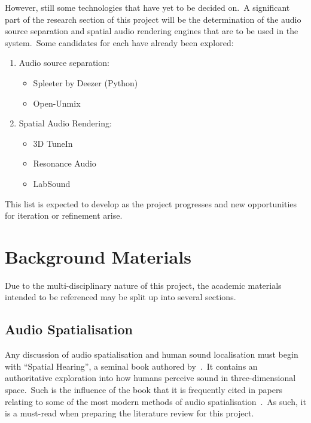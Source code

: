 \documentclass[a4paper, 12pt, british]{article}
\begin{document}
However, still some technologies that have yet to be decided on.\ A significant part of the research section of this project will be the determination of the audio source separation and spatial audio rendering engines that are to be used in the system.\ Some candidates for each have already been explored:

\begin{enumerate}
    \item Audio source separation:
    \begin{itemize}
        \item Spleeter by Deezer (Python)
        \item Open-Unmix
    \end{itemize}
    \item Spatial Audio Rendering:
    \begin{itemize}
        \item 3D TuneIn
        \item Resonance Audio
        \item LabSound
    \end{itemize}
\end{enumerate}

This list is expected to develop as the project progresses and new opportunities for iteration or refinement arise.

\section{Background Materials}\label{sec:background-materials}

Due to the multi-disciplinary nature of this project, the academic materials intended to be referenced may be split up into several sections.

\subsection{Audio Spatialisation}\label{subsec:audio-spatialisation}
Any discussion of audio spatialisation and human sound localisation must begin with ``Spatial Hearing'', a seminal book authored by~\cite{blauert_spatial_hearing}.\ It contains an authoritative exploration into how humans perceive sound in three-dimensional space.\ Such is the influence of the book that it is frequently cited in papers relating to some of the most modern methods of audio spatialisation~\citep{3d_tune_in}.\ As such, it is a must-read when preparing the literature review for this project.
\end{document}
